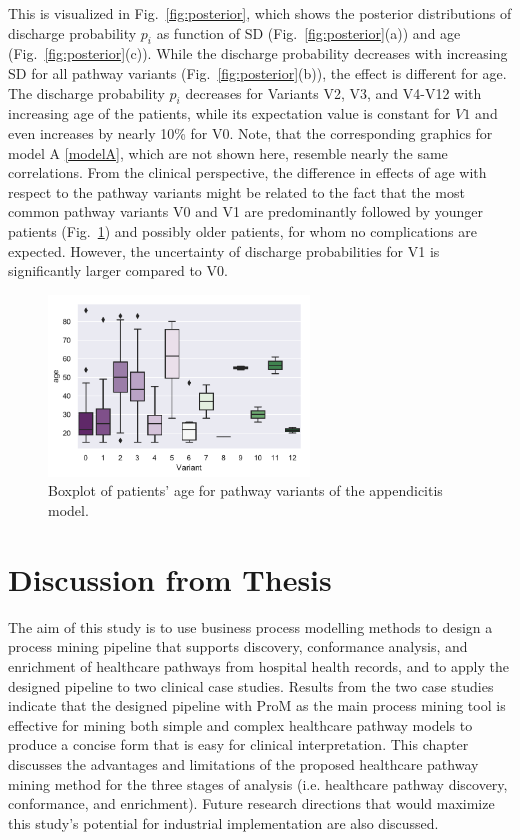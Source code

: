 This is visualized in Fig.~\ref{fig:posterior}, which shows the posterior distributions of discharge probability $p_i$ as function of SD (Fig.~\ref{fig:posterior}(a)) and age (Fig.~\ref{fig:posterior}(c)). While the discharge probability decreases with increasing SD for all pathway variants (Fig.~\ref{fig:posterior}(b)), the effect is different for age. 
The discharge probability $p_i$ decreases for Variants V2, V3, and V4-V12 with increasing age of the patients, while its expectation value is constant for $V1$ and even increases by nearly 10\% for V0. Note, that the corresponding graphics for model A \eqref{modelA}, which are not shown here, resemble nearly the same correlations. 
From the clinical perspective, the difference in effects of age with
respect to the pathway variants might be related to the fact that the
most common pathway variants V0 and V1 are predominantly followed by younger patients (Fig.~\ref{Fig:boxplot}) and possibly older patients, for whom no complications are expected. 
However, the uncertainty of discharge probabilities for V1 is significantly larger compared to V0.

\begin{figure}
  \centering
  \includegraphics[width=0.618\textwidth]{images/DS19fA0_Lin20180730a__boxplot_age_variant.pdf}
\caption{Boxplot of patients' age for pathway variants of the
  appendicitis model.}
\label{Fig:boxplot}
\end{figure}

\section{Discussion from Thesis}
The aim of this study is to use business process modelling methods to design a process mining pipeline that supports discovery, conformance analysis, and enrichment of healthcare pathways from hospital health records, and to apply the designed pipeline to two clinical case studies. Results from the two case studies indicate that the designed pipeline with ProM as the main process mining tool is effective for mining both simple and complex healthcare pathway models to produce a concise form that is easy for clinical interpretation. This chapter discusses the advantages and limitations of the proposed healthcare pathway mining method for the three stages of analysis (i.e. healthcare pathway discovery, conformance, and enrichment). Future research directions that would maximize this study’s potential for industrial implementation are also discussed.

